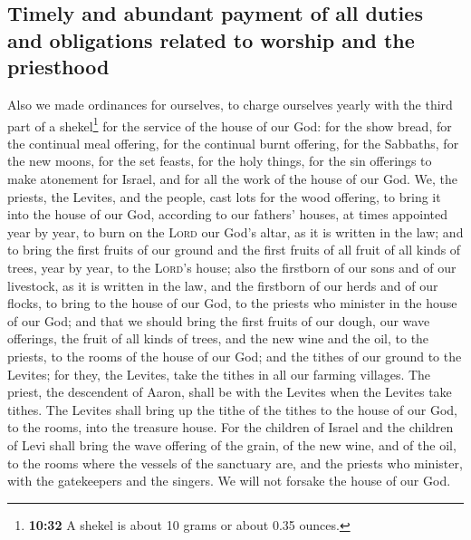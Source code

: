 \hypertarget{timely-and-abundant-payment-of-all-duties-and-obligations-related-to-worship-and-the-priesthood}{%
\subsection{Timely and abundant payment of all duties and obligations
related to worship and the
priesthood}\label{timely-and-abundant-payment-of-all-duties-and-obligations-related-to-worship-and-the-priesthood}}

 Also we made ordinances for ourselves, to charge
ourselves yearly with the third part of a shekel\footnote{\textbf{10:32}
  A shekel is about 10 grams or about 0.35 ounces.} for the service of
the house of our God:  for the show bread, for the
continual meal offering, for the continual burnt offering, for the
Sabbaths, for the new moons, for the set feasts, for the holy things,
for the sin offerings to make atonement for Israel, and for all the work
of the house of our God.  We, the priests, the Levites,
and the people, cast lots for the wood offering, to bring it into the
house of our God, according to our fathers' houses, at times appointed
year by year, to burn on the \textsc{Lord} our God's altar, as it is
written in the law;  and to bring the first fruits of our
ground and the first fruits of all fruit of all kinds of trees, year by
year, to the \textsc{Lord}'s house;  also the firstborn
of our sons and of our livestock, as it is written in the law, and the
firstborn of our herds and of our flocks, to bring to the house of our
God, to the priests who minister in the house of our God;
 and that we should bring the first fruits of our dough,
our wave offerings, the fruit of all kinds of trees, and the new wine
and the oil, to the priests, to the rooms of the house of our God; and
the tithes of our ground to the Levites; for they, the Levites, take the
tithes in all our farming villages.  The priest, the
descendent of Aaron, shall be with the Levites when the Levites take
tithes. The Levites shall bring up the tithe of the tithes to the house
of our God, to the rooms, into the treasure house.  For
the children of Israel and the children of Levi shall bring the wave
offering of the grain, of the new wine, and of the oil, to the rooms
where the vessels of the sanctuary are, and the priests who minister,
with the gatekeepers and the singers. We will not forsake the house of
our God.

